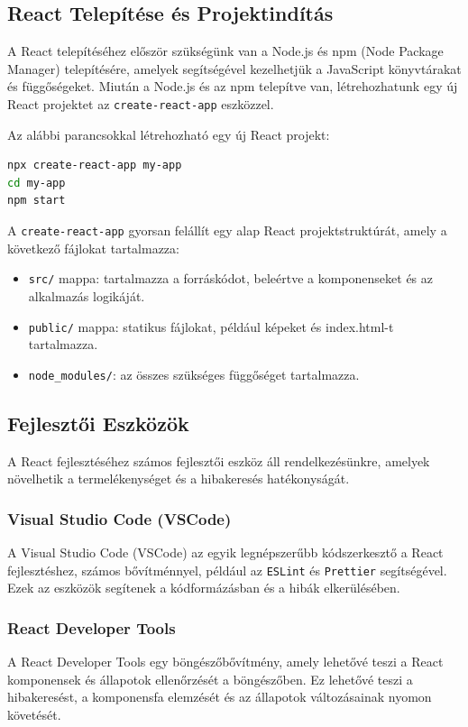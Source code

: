 \documentclass[colorlinks]{thesis-kando}
\theoremstyle{definition}
\theoremstyle{remark}
\begin{document}
\subsection{React Telepítése és Projektindítás}
A React telepítéséhez először szükségünk van a Node.js és npm (Node Package Manager) telepítésére, amelyek segítségével kezelhetjük a JavaScript könyvtárakat és függőségeket. Miután a Node.js és az npm telepítve van, létrehozhatunk egy új React projektet az \texttt{create-react-app} eszközzel.

Az alábbi parancsokkal létrehozható egy új React projekt:
\begin{lstlisting}[language=bash]
npx create-react-app my-app
cd my-app
npm start
\end{lstlisting}

\pagebreak

A \texttt{create-react-app} gyorsan felállít egy alap React projektstruktúrát, amely a következő fájlokat tartalmazza:
\begin{itemize}
    \item \texttt{src/} mappa: tartalmazza a forráskódot, beleértve a komponenseket és az alkalmazás logikáját.
    \item \texttt{public/} mappa: statikus fájlokat, például képeket és index.html-t tartalmazza.
    \item \texttt{node\_modules/}: az összes szükséges függőséget tartalmazza.
\end{itemize}

\subsection{Fejlesztői Eszközök}
A React fejlesztéséhez számos fejlesztői eszköz áll rendelkezésünkre, amelyek növelhetik a termelékenységet és a hibakeresés hatékonyságát.

\subsubsection{Visual Studio Code (VSCode)}
A Visual Studio Code (VSCode) az egyik legnépszerűbb kódszerkesztő a React fejlesztéshez, számos bővítménnyel, például az \texttt{ESLint} és \texttt{Prettier} segítségével. Ezek az eszközök segítenek a kódformázásban és a hibák elkerülésében.

\subsubsection{React Developer Tools}
A React Developer Tools egy böngészőbővítmény, amely lehetővé teszi a React komponensek és állapotok ellenőrzését a böngészőben. Ez lehetővé teszi a hibakeresést, a komponensfa elemzését és az állapotok változásainak nyomon követését.
\end{document}
